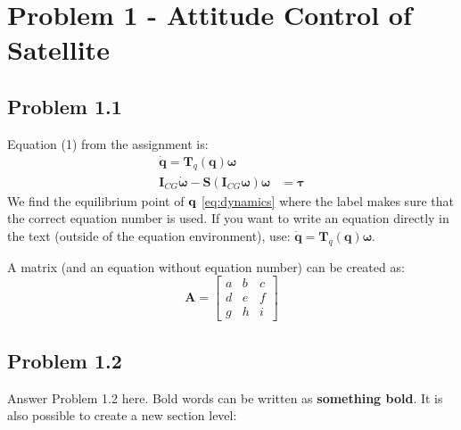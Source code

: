 

\section*{Problem 1 - Attitude Control of Satellite}

\subsection*{Problem 1.1} 
Equation (1) from the assignment is:
\begin{equation}
\label{eq:dynamics}
	\begin{aligned}
		\dot{\mathbf{q}} = \mathbf{T}_q (\mathbf{q} ) \boldsymbol{\omega} \\
		\mathbf{I}_{CG} \dot{\boldsymbol{\omega}} - \mathbf{S} (\mathbf{I}_{CG} \boldsymbol{\omega} ) \boldsymbol{\omega} & =  \boldsymbol{\tau}
	\end{aligned}	
\end{equation}
We find the equilibrium point of  $\mathbf{q}$ \eqref{eq:dynamics} where the label makes sure that the correct equation number is used. If you want to write an equation directly in the text (outside of the equation environment), use: $\dot{\mathbf{q}} = \mathbf{T}_q (\mathbf{q} ) \boldsymbol{\omega}$. %

A matrix (and an equation without equation number) can be created as: 
\begin{equation*}	%
	\mathbf{A} = 
	\begin{bmatrix}
		a & b & c \\ d & e & f \\ g & h & i
	\end{bmatrix}
\end{equation*}

\subsection*{Problem 1.2}
Answer Problem 1.2 here. Bold words can be written as \textbf{something bold}. It is also possible to create a new section level:
